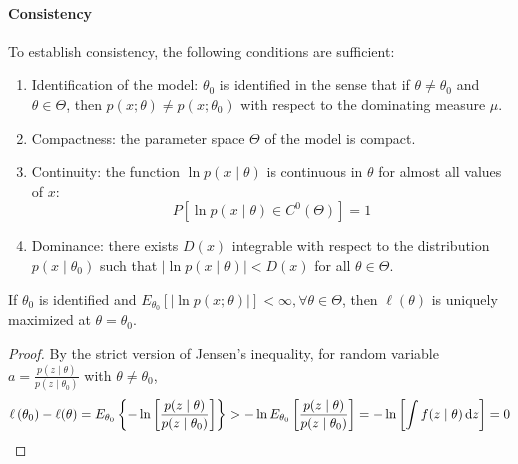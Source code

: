 \paragraph{Consistency}

To establish consistency, the following conditions are sufficient:
\begin{enumerate}
	\item Identification of the model: $\theta_{0}$ is identified in the sense that if $\theta\neq\theta_{0}$ and $\theta\in\Theta$, then $p(x;\theta)\neq p\left(x;\theta_{0}\right)$ with respect to the dominating measure $\mu$.
	\item Compactness: the parameter space $\Theta$ of the model is compact.
	\item Continuity: the function $\ln p(x\mid\theta)$ is continuous in $\theta$ for almost all values of $x$:
	      \begin{equation}
		      P\left[\ln p(x\mid\theta)\in C^{0}(\Theta)\right]=1
	      \end{equation}
	\item Dominance: there exists $D(x)$ integrable with respect to the distribution $p\left(x\mid\theta_{0}\right)$ such that $|\ln p\left(x\mid\theta\right)|<D(x)$ for all $\theta\in \Theta$.
\end{enumerate}

\begin{lemma}
	If $\theta_{0}$ is identified and $E_{\theta_{0}}\left[|\ln p(x;\theta)|\right]<\infty,\forall\theta\in\Theta$, then $\ell(\theta)$ is uniquely maximized at $\theta=\theta_{0}$.
\end{lemma}

\begin{proof}
	By the strict version of Jensen's inequality, for random variable $a=\frac{p(z\mid\theta)}{p(z\mid\theta_{0})}$ with $\theta\neq\theta_{0}$,
	\begin{equation}
		\ell\left(\theta_{0}\right)-\ell(\theta)=E_{\theta_{0}}\left\{-\ln\left[\frac{p(z\mid\theta)}{p(z\mid\theta_{0})}\right]\right\}>-\ln E_{\theta_{0}}\left[\frac{p(z\mid\theta)}{p(z\mid\theta_{0})}\right]=-\ln \left[\int f(z \mid \theta) \mathop{}\!\mathrm{d} z\right]=0
	\end{equation}
\end{proof}

